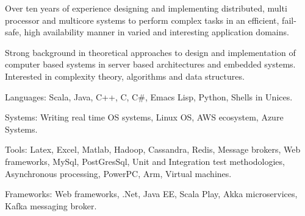 

\begin{cventries}

\cventryOnlyDescription
      {\begin{cvitems} %
        \item {Over ten years of experience designing and implementing distributed, multi processor and multicore systems to perform complex tasks in an efficient, fail-safe, high availability manner in varied and interesting application domains.}
        \item {Strong background in theoretical approaches to design and implementation of computer based systems in server based architectures and embedded systems. Interested in complexity theory, algorithms and  data structures.}
	\item {Languages: Scala, Java, C++, C, C\#, Emacs Lisp, Python, Shells in Unices.}
	\item {Systems: Writing real time OS systems, Linux OS, AWS ecosystem, Azure Systems.}
	\item {Tools: Latex, Excel, Matlab, Hadoop, Cassandra, Redis, Message brokers, Web frameworks, MySql, PostGresSql, Unit and Integration test methodologies, Asynchronous processing, PowerPC, Arm, Virtual machines.}
	\item {Frameworks: Web frameworks, .Net, Java EE, Scala Play, Akka microservices, Kafka messaging broker.}
       \end{cvitems}
      }
\end{cventries}
